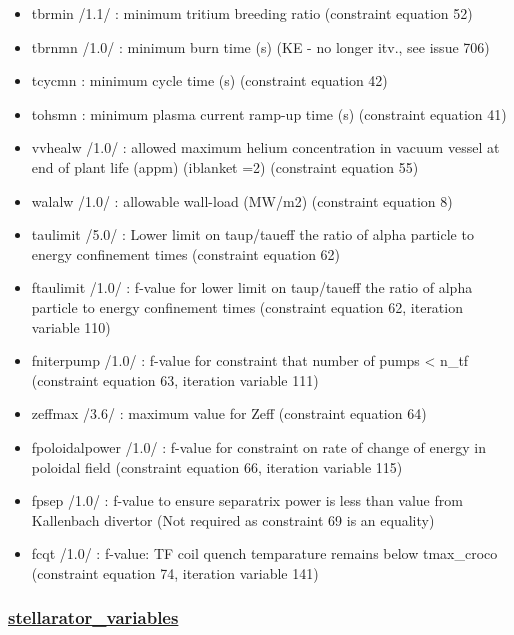 \documentclass[]{article}
\begin{document}
\begin{itemize}
\item
  tbrmin /1.1/ : minimum tritium breeding ratio (constraint equation 52)
\item
  tbrnmn /1.0/ : minimum burn time (s) (KE - no longer itv., see issue
  706)
\item
  tcycmn : minimum cycle time (s) (constraint equation 42)
\item
  tohsmn : minimum plasma current ramp-up time (s) (constraint equation
  41)
\item
  vvhealw /1.0/ : allowed maximum helium concentration in vacuum vessel
  at end of plant life (appm) (iblanket =2) (constraint equation 55)
\item
  walalw /1.0/ : allowable wall-load (MW/m2) (constraint equation 8)
\item
  taulimit /5.0/ : Lower limit on taup/taueff the ratio of alpha
  particle to energy confinement times (constraint equation 62)
\item
  ftaulimit /1.0/ : f-value for lower limit on taup/taueff the ratio of
  alpha particle to energy confinement times (constraint equation 62,
  iteration variable 110)
\item
  fniterpump /1.0/ : f-value for constraint that number of pumps
  \textless{} n_tf (constraint equation 63, iteration variable 111)
\item
  zeffmax /3.6/ : maximum value for Zeff (constraint equation 64)
\item
  fpoloidalpower /1.0/ : f-value for constraint on rate of change of
  energy in poloidal field (constraint equation 66, iteration variable
  115)
\item
  fpsep /1.0/ : f-value to ensure separatrix power is less than value
  from Kallenbach divertor (Not required as constraint 69 is an
  equality)
\item
  fcqt /1.0/ : f-value: TF coil quench temparature remains below
  tmax\_croco (constraint equation 74, iteration variable 141)
\end{itemize}

\subsubsection{\texorpdfstring{\href{stellarator_variables.html}{stellarator\_variables}}{stellarator\_variables}}\label{stellarator_variables}
\end{document}
